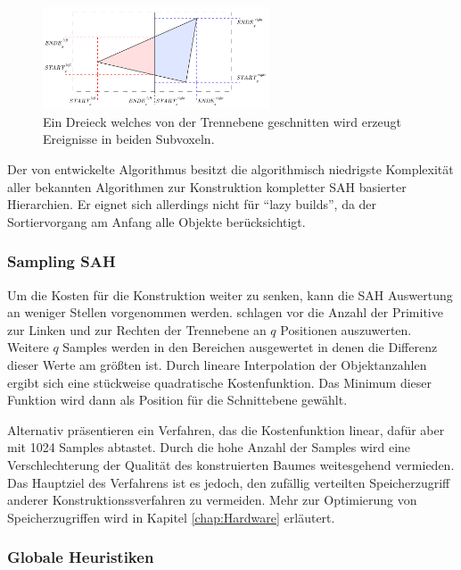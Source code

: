 \begin{figure}\centering
\includegraphics[width=0.6\textwidth]{images/newevents.pdf} 
\caption[Von der Trennebene geschnittenes Dreieck erzeugt neue Ereignisse]{Ein Dreieck welches von der Trennebene geschnitten wird erzeugt Ereignisse in beiden Subvoxeln.}
\label{fig:newevents}
\end{figure}

Der von \cite{WaldHavran06} entwickelte Algorithmus besitzt die algorithmisch niedrigste Komplexität aller bekannten Algorithmen zur Konstruktion kompletter SAH basierter Hierarchien. Er eignet sich allerdings nicht für ``lazy builds'', da der Sortiervorgang am Anfang alle Objekte berücksichtigt.

\subsubsection{Sampling SAH}

Um die Kosten für die Konstruktion weiter zu senken, kann die SAH Auswertung an weniger Stellen vorgenommen werden.
\cite{HWS06} schlagen vor die Anzahl der Primitive zur Linken und zur Rechten der Trennebene an $q$ Positionen auszuwerten. Weitere $q$ Samples werden in den Bereichen ausgewertet in denen die Differenz dieser Werte am größten ist. Durch lineare Interpolation der Objektanzahlen ergibt sich eine stückweise quadratische Kostenfunktion. Das Minimum dieser Funktion wird dann als Position für die Schnittebene gewählt.

Alternativ präsentieren \cite{PGSS06} ein Verfahren, das die Kostenfunktion linear, dafür aber mit 1024 Samples abtastet. Durch die hohe Anzahl der Samples wird eine Verschlechterung der Qualität des konstruierten Baumes weitesgehend vermieden. Das Hauptziel des Verfahrens ist es jedoch, den zufällig verteilten Speicherzugriff anderer Konstruktionssverfahren zu vermeiden. Mehr zur Optimierung von Speicherzugriffen wird in Kapitel \ref{chap:Hardware} erläutert.

\subsubsection{Globale Heuristiken}

